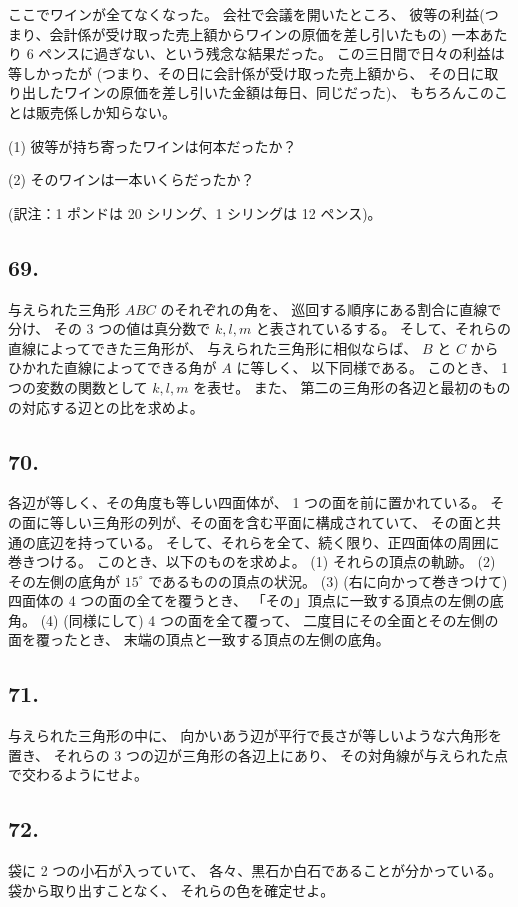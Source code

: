 ここでワインが全てなくなった。
会社で会議を開いたところ、
彼等の利益(つまり、会計係が受け取った売上額からワインの原価を差し引いたもの)
一本あたり 6 ペンスに過ぎない、という残念な結果だった。
この三日間で日々の利益は等しかったが
(つまり、その日に会計係が受け取った売上額から、
その日に取り出したワインの原価を差し引いた金額は毎日、同じだった)、
もちろんこのことは販売係しか知らない。

(1)
彼等が持ち寄ったワインは何本だったか？

(2)
そのワインは一本いくらだったか？

(訳注：1 ポンドは 20 シリング、1 シリングは 12 ペンス)。

\begin{flushright}
[28/2/89]
\end{flushright}

\subsection*{69.}

与えられた三角形 $ABC$ のそれぞれの角を、
巡回する順序にある割合に直線で分け、
その 3 つの値は真分数で $k, l, m$ と表されているする。
そして、それらの直線によってできた三角形が、
与えられた三角形に相似ならば、
$B$ と $C$ からひかれた直線によってできる角が $A$ に等しく、
以下同様である。
このとき、 1 つの変数の関数として $k, l, m$ を表せ。
また、
第二の三角形の各辺と最初のものの対応する辺との比を求めよ。

\begin{flushright}
[8/89]
\end{flushright}

\subsection*{70.}

各辺が等しく、その角度も等しい四面体が、 1 つの面を前に置かれている。
その面に等しい三角形の列が、その面を含む平面に構成されていて、
その面と共通の底辺を持っている。
そして、それらを全て、続く限り、正四面体の周囲に巻きつける。
このとき、以下のものを求めよ。
(1)
それらの頂点の軌跡。
(2)
その左側の底角が $15^\circ$ であるものの頂点の状況。
(3)
(右に向かって巻きつけて)四面体の 4 つの面の全てを覆うとき、
「その」頂点に一致する頂点の左側の底角。
(4)
(同様にして) 4 つの面を全て覆って、
二度目にその全面とその左側の面を覆ったとき、
末端の頂点と一致する頂点の左側の底角。

\subsection*{71.}

与えられた三角形の中に、
向かいあう辺が平行で長さが等しいような六角形を置き、
それらの 3 つの辺が三角形の各辺上にあり、
その対角線が与えられた点で交わるようにせよ。

\begin{flushright}
[14/12/74]
\end{flushright}

\subsection*{72.}

袋に 2 つの小石が入っていて、
各々、黒石か白石であることが分かっている。
袋から取り出すことなく、
それらの色を確定せよ。

\begin{flushright}
[8/9//87]
\end{flushright}


